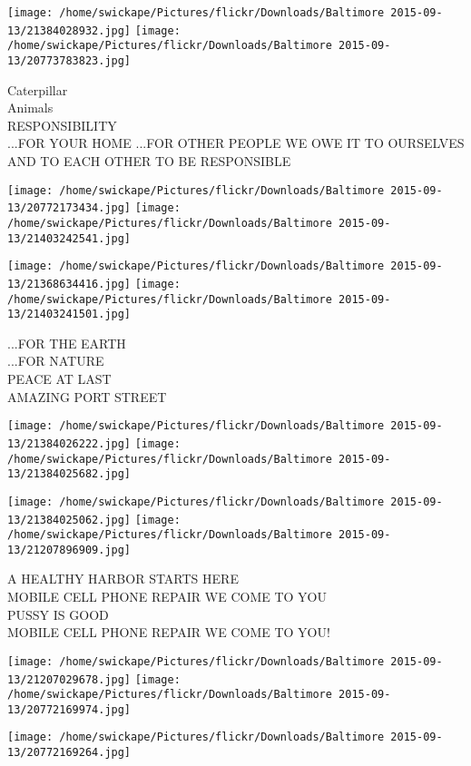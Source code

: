 \documentclass[10pt,letterpaper]{article}
\begin{document}
\texttt{[image: /home/swickape/Pictures/flickr/Downloads/Baltimore 2015-09-13/21384028932.jpg]}
\texttt{[image: /home/swickape/Pictures/flickr/Downloads/Baltimore 2015-09-13/20773783823.jpg]}

Caterpillar\\
Animals\\
RESPONSIBILITY\\
...FOR YOUR HOME ...FOR OTHER PEOPLE WE OWE IT TO OURSELVES AND TO EACH OTHER TO BE RESPONSIBLE\\
\pagebreak

\texttt{[image: /home/swickape/Pictures/flickr/Downloads/Baltimore 2015-09-13/20772173434.jpg]}
\texttt{[image: /home/swickape/Pictures/flickr/Downloads/Baltimore 2015-09-13/21403242541.jpg]}

\texttt{[image: /home/swickape/Pictures/flickr/Downloads/Baltimore 2015-09-13/21368634416.jpg]}
\texttt{[image: /home/swickape/Pictures/flickr/Downloads/Baltimore 2015-09-13/21403241501.jpg]}

...FOR THE EARTH\\
...FOR NATURE\\
PEACE AT LAST\\
AMAZING PORT STREET\\
\pagebreak

\texttt{[image: /home/swickape/Pictures/flickr/Downloads/Baltimore 2015-09-13/21384026222.jpg]}
\texttt{[image: /home/swickape/Pictures/flickr/Downloads/Baltimore 2015-09-13/21384025682.jpg]}

\texttt{[image: /home/swickape/Pictures/flickr/Downloads/Baltimore 2015-09-13/21384025062.jpg]}
\texttt{[image: /home/swickape/Pictures/flickr/Downloads/Baltimore 2015-09-13/21207896909.jpg]}

A HEALTHY HARBOR STARTS HERE\\
MOBILE CELL PHONE REPAIR WE COME TO YOU\\
PUSSY IS GOOD\\
MOBILE CELL PHONE REPAIR WE COME TO YOU!\\
\pagebreak

\texttt{[image: /home/swickape/Pictures/flickr/Downloads/Baltimore 2015-09-13/21207029678.jpg]}
\texttt{[image: /home/swickape/Pictures/flickr/Downloads/Baltimore 2015-09-13/20772169974.jpg]}

\vspace{0.25in}
\texttt{[image: /home/swickape/Pictures/flickr/Downloads/Baltimore 2015-09-13/20772169264.jpg]}
\end{document}
